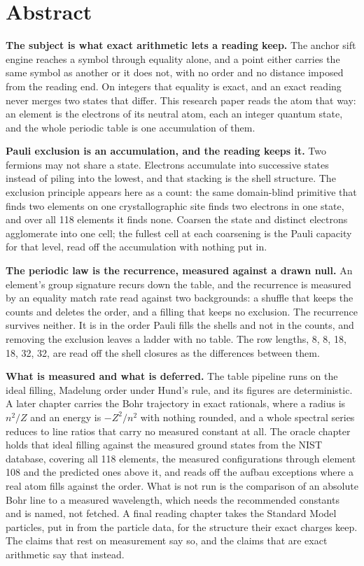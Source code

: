 \chapter*{Abstract}

\textbf{The subject is what exact arithmetic lets a reading keep.} The anchor sift engine reaches a
symbol through equality alone, and a point either carries the same symbol as another or it does not,
with no order and no distance imposed from the reading end. On integers that equality is exact, and
an exact reading never merges two states that differ. This research paper reads the atom that way: an element
is the electrons of its neutral atom, each an integer quantum state, and the whole periodic table is
one accumulation of them.

\textbf{Pauli exclusion is an accumulation, and the reading keeps it.} Two fermions may not share a
state. Electrons accumulate into successive states instead of piling into the lowest, and that
stacking is the shell structure. The exclusion principle appears here as a count: the same
domain-blind primitive that finds two elements on one crystallographic site finds two electrons in
one state, and over all 118 elements it finds none. Coarsen the state and distinct electrons
agglomerate into one cell; the fullest cell at each coarsening is the Pauli capacity for that level,
read off the accumulation with nothing put in.

\textbf{The periodic law is the recurrence, measured against a drawn null.} An element's group
signature recurs down the table, and the recurrence is measured by an equality match rate read
against two backgrounds: a shuffle that keeps the counts and deletes the order, and a filling that
keeps no exclusion. The recurrence survives neither. It is in the order Pauli fills the shells and
not in the counts, and removing the exclusion leaves a ladder with no table. The row lengths, 8, 8,
18, 18, 32, 32, are read off the shell closures as the differences between them.

\textbf{What is measured and what is deferred.} The table pipeline runs on the ideal filling,
Madelung order under Hund's rule, and its figures are deterministic. A later chapter carries the Bohr
trajectory in exact rationals, where a radius is $n^2/Z$ and an energy is $-Z^2/n^2$ with nothing
rounded, and a whole spectral series reduces to line ratios that carry no measured constant at all.
The oracle chapter holds that ideal filling against the measured ground states from the NIST database,
covering all 118 elements, the measured configurations through element 108 and the predicted ones
above it, and reads off the aufbau exceptions where a real atom fills against the order. What is not
run is the comparison of an absolute Bohr line to a measured wavelength, which needs the recommended
constants and is named, not fetched. A final reading chapter takes the Standard Model particles, put
in from the particle data, for the structure their exact charges keep. The claims that rest on
measurement say so, and the claims that are exact arithmetic say that instead.
